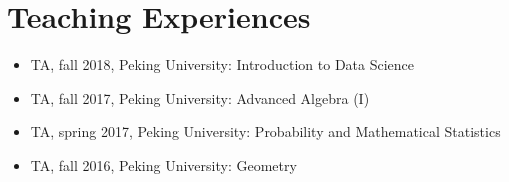 \documentclass[letterpaper,11pt]{article}
\newcommand{\resumeSubHeadingListStart}{\begin{itemize}[leftmargin=*]}
\newcommand{\resumeSubHeadingListEnd}{\end{itemize}}
\begin{document}





\section{Teaching Experiences}
\resumeSubHeadingListStart
\item{TA, fall 2018, Peking University: Introduction to Data Science}
\item{TA, fall 2017, Peking University: Advanced Algebra (I)}
\item{TA, spring 2017, Peking University: Probability and Mathematical Statistics}
\item{TA, fall 2016, Peking University: Geometry} 
\resumeSubHeadingListEnd


\end{document}
